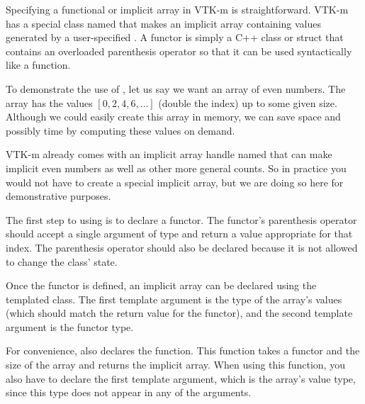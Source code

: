 Specifying a functional or implicit array in VTK-m is straightforward.
VTK-m has a special class named  that makes
an implicit array containing values generated by a user-specified
.  A functor is simply a C++ class or
struct that contains an overloaded parenthesis operator so that it can be
used syntactically like a function.

To demonstrate the use of , let us say
we want an array of even numbers. The array has the values
$[0,2,4,6,\ldots]$ (double the index) up to some given size. Although we
could easily create this array in memory, we can save space and possibly
time by computing these values on demand.

\begin{didyouknow}
  VTK-m already comes with an implicit array handle named
   that can make implicit even numbers as
  well as other more general counts. So in practice you would not have to
  create a special implicit array, but we are doing so here for
  demonstrative purposes.
\end{didyouknow}

The first step to using  is to declare
a functor. The functor's parenthesis operator should accept a single
argument of type  and return a value appropriate for that index.
The parenthesis operator should also be declared  because
it is not allowed to change the class' state.


Once the functor is defined, an implicit array can be declared using the
templated  class. The first template argument
is the type of the array's values (which should match the return value for
the functor), and the second template argument is the functor type.


For convenience,  also
declares the  function. This function
takes a functor and the size of the array and returns the implicit array.
When using this function, you also have to declare the first template
argument, which is the array's value type, since this type does not appear
in any of the arguments.

